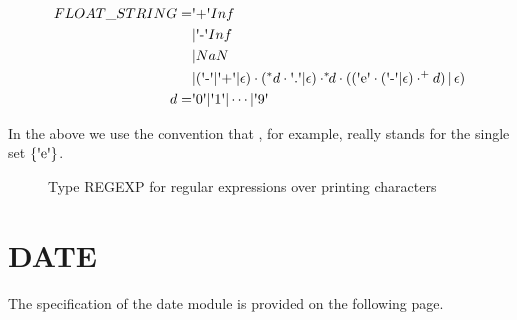 \documentclass[runningheads,12pt]{article}
\begin{document}
\begin{align}
FLOAT\_STRING = &\squote{+}Inf\\
&|\squote{-}Inf\\
&|NaN\\
&|(\squote{-}|\squote{+}|\epsilon)\cdot(^*d\cdot\squote{.}|\epsilon)\cdot
	^*\!\!d\cdot ((\squote{e}\cdot(\squote{-}|\epsilon)\cdot^\textrm{+}d)\,|\,\epsilon)\\
d = &\squote{0} | \squote{1} | \cdots |\squote{9} 
\end{align}

In the above we use the convention that , for example, really stands for the single set $\{\squote{e}\}$.


\begin{figure} [H]

\caption{Type REGEXP for regular expressions over printing characters}
\end{figure}




\section{DATE}
The specification of the date module is provided on the following page.
\newpage

\centering 
    
\end{document}
